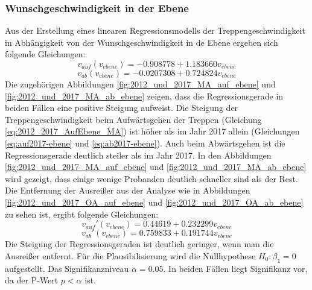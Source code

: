 \subsubsection{Wunschgeschwindigkeit in der Ebene}
Aus der Erstellung eines linearen Regressionsmodells der Treppengeschwindigkeit in Abhängigkeit von der Wunschgeschwindigkeit in de Ebene ergeben sich folgende Gleichungen:
\begin{equation}
v_{auf}(v_{ebene}) = -0.908778 + 1.183660 v_{ebene}
\label{eq:2012_2017_AufEbene_MA}
\end{equation}
\begin{equation}
v_{ab}(v_{ebene}) = -0.0207308+0.724824 v_{ebene}
\label{eq:2012_2017_AbEbene_MA}
\end{equation}
Die zugehörigen Abbildungen \ref{fig:2012_und_2017_MA_auf_ebene} und \ref{fig:2012_und_2017_MA_ab_ebene} zeigen, dass die Regressionsgerade in beiden Fällen eine positive Steigung aufweist. Die Steigung der Treppengeschwindigkeit beim Aufwärtsgehen der Treppen (Gleichung \ref{eq:2012_2017_AufEbene_MA}) ist höher als im Jahr 2017 allein (Gleichungen \ref{eq:auf2017-ebene} und \ref{eq:ab2017-ebene}). Auch beim Abwärtsgehen ist die Regressionsgerade deutlich steiler als im Jahr 2017. In den Abbildungen \ref{fig:2012_und_2017_MA_auf_ebene} und \ref{fig:2012_und_2017_MA_ab_ebene} wird gezeigt, dass einige wenige Probanden deutlich schneller sind als der Rest. Die Entfernung der Ausreißer aus der Analyse wie in Abbildungen \ref{fig:2012_und_2017_OA_auf_ebene} und \ref{fig:2012_und_2017_OA_ab_ebene} zu sehen ist, ergibt folgende Gleichungen: 
\begin{equation}
v_{auf}'(v_{ebene}) = 0.44619 +0.232299 v_{ebene}
\label{eq:2012_2017_AufEbene_OA}
\end{equation}
\begin{equation}
v_{ab}'(v_{ebene}) = 0.759833 +0.191744 v_{ebene}
\label{eq:2012_2017_AbEbene_OA}
\end{equation}
Die Steigung der Regressionsgeraden ist deutlich geringer, wenn man die Ausreißer entfernt. 
Für die Plausibilisierung wird die Nullhypothese $H_0: \beta_1 = 0$ aufgestellt. Das Signifikanzniveau $\alpha= 0.05$. In beiden Fällen liegt Signifikanz vor, da der P-Wert $p<\alpha$ ist.

